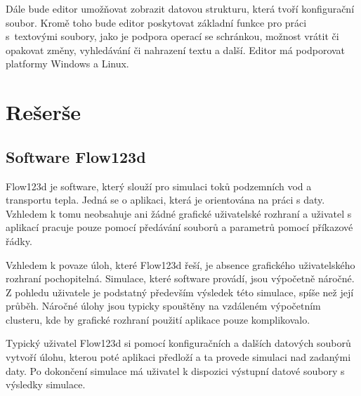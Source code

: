 \documentclass[FM,DP]{tulthesis}
\begin{document}
Dále bude editor umožňovat zobrazit datovou strukturu, která tvoří konfigurační soubor. Kromě toho bude editor poskytovat základní funkce pro práci s~textovými soubory, jako je podpora operací se schránkou, možnost vrátit či opakovat změny, vyhledávání či nahrazení textu a další. Editor má podporovat platformy Windows a Linux.



\chapter{Rešerše}





\section{Software Flow123d}


Flow123d je software, který slouží pro simulaci toků podzemních vod a transportu tepla. Jedná se o aplikaci, která je orientována na práci s daty. Vzhledem k tomu neobsahuje ani žádné grafické uživatelské rozhraní a uživatel s aplikací pracuje pouze pomocí předávání souborů a parametrů pomocí příkazové řádky.

Vzhledem k povaze úloh, které Flow123d řeší, je absence grafického uživatelského rozhraní pochopitelná. Simulace, které software provádí, jsou výpočetně náročné. Z pohledu uživatele je podstatný především výsledek této simulace, spíše než její průběh. Náročné úlohy jsou typicky spouštěny na vzdáleném výpočetním clusteru, kde by grafické rozhraní použití aplikace pouze komplikovalo.

Typický uživatel Flow123d si pomocí konfiguračních a dalších datových souborů vytvoří úlohu, kterou poté aplikaci předloží a ta provede simulaci nad zadanými daty. Po dokončení simulace má uživatel k dispozici výstupní datové soubory s výsledky simulace.
\end{document}
